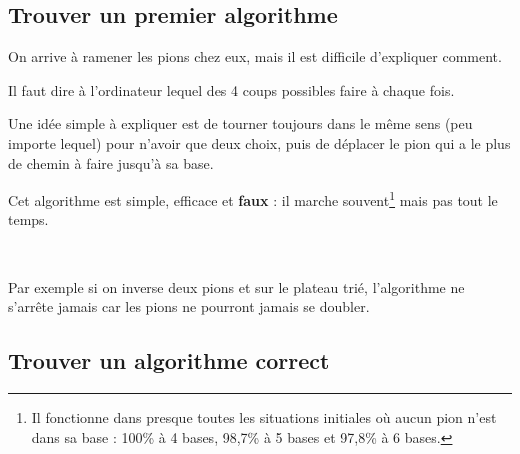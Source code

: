 \documentclass[a7paper,pagesize,DIV=14,10pt]{scrbook}
\begin{document}
\newpage 
\subsection*{Trouver un premier algorithme}
\vspace{-.5\baselineskip}

On arrive à ramener les pions chez eux, mais il est difficile
d'expliquer comment.

Il faut dire à l'ordinateur lequel des 4 coups possibles faire à chaque
fois.

Une idée simple à expliquer est de tourner toujours dans le même sens
(peu importe lequel) pour n'avoir que deux choix, puis de déplacer le
pion qui a le plus de chemin à faire jusqu'à sa base.

Cet algorithme est simple, efficace et \textbf{faux} : il marche
souvent\footnote{Il fonctionne dans presque toutes les situations
  initiales où aucun pion n'est dans sa base : 100\% à 4 bases, 98,7\%
  à 5 bases et 97,8\% à 6 bases.} mais pas tout le temps.

\begin{minipage}{.36\linewidth}
\end{minipage}~
\begin{minipage}{.63\linewidth}
  Par exemple si on inverse deux pions  et  sur le
  plateau trié, l'algorithme ne s'arrête jamais car les pions ne
  pourront jamais se doubler.
\end{minipage}

\newpage
\newcommand{\ligneMaison}[2]{
  \begin{tikzpicture}
    \foreach \x/\col in {#1} {
      \draw (.55*\x,.5) node[shape=circle,fill=\col,draw=black,inner sep=.1] {~~~};
    }
    \foreach \x/\col in {#2} {
      \draw (.55*\x,.25) node[shape=circle,fill=\col,draw=black,inner sep=.1] {~~~};
    }
    \foreach \x/\col in {1/A, 2/B, 3/C, 4/D, 5/E} {
      \draw (.55*\x,-.25) node[shape=ellipse,fill=\col,draw=black,rotate=90] {~~~};
    }
  \end{tikzpicture}
}
\subsection*{Trouver un algorithme correct}
\vspace{-.5\baselineskip}
\end{document}
